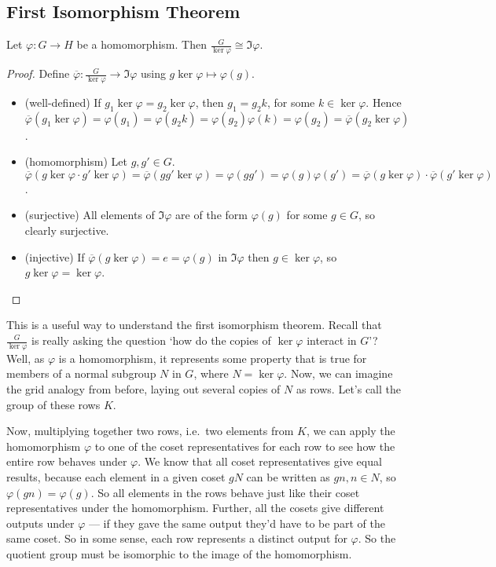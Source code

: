\subsection{First Isomorphism Theorem}
\begin{theorem}
	Let \(\varphi: G \to H\) be a homomorphism.
	Then \(\frac{G}{\ker \varphi} \cong \Im \varphi\).
\end{theorem}
\begin{proof}
	Define \(\overline \varphi: \frac{G}{\ker \varphi} \to \Im \varphi\) using \(g \ker \varphi \mapsto \varphi(g)\).
	\begin{itemize}
		\item (well-defined) If \(g_1 \ker \varphi = g_2 \ker \varphi\), then \(g_1 = g_2k\), for some \(k \in \ker \varphi\).
		      Hence \(\overline\varphi(g_1 \ker \varphi) = \varphi(g_1) = \varphi(g_2k) = \varphi(g_2)\varphi(k) = \varphi(g_2) = \overline\varphi(g_2 \ker \varphi)\).
		\item (homomorphism) Let \(g, g' \in G\).
		      \(\overline\varphi(g \ker \varphi \cdot g' \ker \varphi) = \overline\varphi(gg' \ker \varphi) = \varphi(gg') = \varphi(g)\varphi(g') = \overline\varphi(g\ker\varphi) \cdot \overline\varphi(g'\ker\varphi)\).
		\item (surjective) All elements of \(\Im \varphi\) are of the form \(\varphi(g)\) for some \(g \in G\), so clearly surjective.
		\item (injective) If \(\overline\varphi(g \ker \varphi) = e = \varphi(g)\) in \(\Im \varphi\) then \(g \in \ker \varphi\), so \(g \ker \varphi = \ker \varphi\).
	\end{itemize}
\end{proof}
This is a useful way to understand the first isomorphism theorem.
Recall that \(\frac{G}{\ker \varphi}\) is really asking the question `how do the copies of \(\ker \varphi\) interact in \(G\)'? Well, as \(\varphi\) is a homomorphism, it represents some property that is true for members of a normal subgroup \(N\) in \(G\), where \(N = \ker \varphi\).
Now, we can imagine the grid analogy from before, laying out several copies of \(N\) as rows.
Let's call the group of these rows \(K\).

Now, multiplying together two rows, i.e.\ two elements from \(K\), we can apply the homomorphism \(\varphi\) to one of the coset representatives for each row to see how the entire row behaves under \(\varphi\).
We know that all coset representatives give equal results, because each element in a given coset \(gN\) can be written as \(gn, n \in N\), so \(\varphi(gn) = \varphi(g)\).
So all elements in the rows behave just like their coset representatives under the homomorphism.
Further, all the cosets give different outputs under \(\varphi\) --- if they gave the same output they'd have to be part of the same coset.
So in some sense, each row represents a distinct output for \(\varphi\).
So the quotient group must be isomorphic to the image of the homomorphism.

